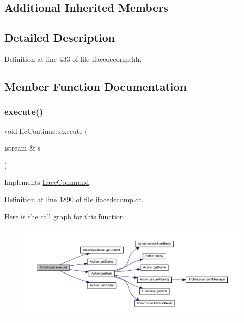 \subsection*{Additional Inherited Members}


\subsection{Detailed Description}


Definition at line 433 of file ifacedecomp.\+hh.



\subsection{Member Function Documentation}
\mbox{\label{class_ifc_continue_a422d9ffe63d6c9cea18cd8e494b7e6fb}} 
\subsubsection{\texorpdfstring{execute()}{execute()}}
{\footnotesize\ttfamily void Ifc\+Continue\+::execute (\begin{DoxyParamCaption}\item[{istream \&}]{s }\end{DoxyParamCaption})\hspace{0.3cm}{\ttfamily [virtual]}}



Implements \mbox{\hyperlink{class_iface_command_af10e29cee2c8e419de6efe9e680ad201}{Iface\+Command}}.



Definition at line 1890 of file ifacedecomp.\+cc.

Here is the call graph for this function\+:
\nopagebreak
\begin{figure}[H]
\begin{center}
\leavevmode
\includegraphics[width=350pt]{class_ifc_continue_a422d9ffe63d6c9cea18cd8e494b7e6fb_cgraph}
\end{center}
\end{figure}


